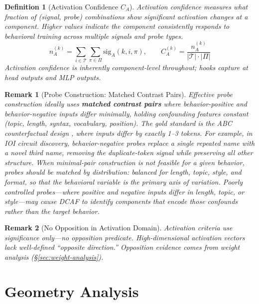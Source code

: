 \documentclass[11pt]{article}
\newtheorem{definition}{Definition}[section]
\newtheorem{remark}{Remark}[section]
\begin{document}
\begin{definition}[Activation Confidence $C_A$]
\label{def:activation-confidence}
Activation confidence measures what fraction of (signal, probe) combinations show significant activation changes at a component. Higher values indicate the component consistently responds to behavioral training across multiple signals and probe types.
\begin{equation}
n^{(k)}_A = \sum_{i \in \mathcal{T}} \sum_{\pi \in \Pi} \text{sig}_A(k, i, \pi), \qquad C^{(k)}_A = \frac{n^{(k)}_A}{|\mathcal{T}| \cdot |\Pi|}
\end{equation}
Activation confidence is inherently component-level throughout; hooks capture at head outputs and MLP outputs.
\end{definition}

\begin{remark}[Probe Construction: Matched Contrast Pairs]
\label{rem:probe-construction-matched-contrast-pairs}
Effective probe construction ideally uses \textbf{matched contrast pairs} where behavior-positive and behavior-negative inputs differ minimally, holding confounding features constant (topic, length, syntax, vocabulary, position). The gold standard is the ABC counterfactual design \citep{wang2023ioi}, where inputs differ by exactly 1--3 tokens. For example, in IOI circuit discovery, behavior-negative probes replace a single repeated name with a novel third name, removing the duplicate-token signal while preserving all other structure. When minimal-pair construction is not feasible for a given behavior, probes should be matched by distribution: balanced for length, topic, style, and format, so that the behavioral variable is the primary axis of variation. Poorly controlled probes---where positive and negative inputs differ in length, topic, or style---may cause DCAF to identify components that encode those confounds rather than the target behavior.
\end{remark}

\begin{remark}[No Opposition in Activation Domain]
\label{rem:no-opposition-in-activation-domain}
Activation criteria use significance only---no opposition predicate. High-dimensional activation vectors lack well-defined ``opposite direction.'' Opposition evidence comes from weight analysis (\S\ref{sec:weight-analysis}).
\end{remark}

\section{Geometry Analysis}
\label{sec:geometry-analysis}
\end{document}
